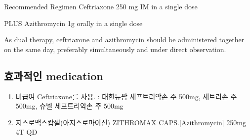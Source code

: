 \begin{commentbox}{Recommended Regimen}
Ceftriaxone 250 mg IM in a single dose \par
PLUS Azithromycin 1g orally in a single dose \par
As dual therapy, ceftriaxone and azithromycin should be administered together on the same day, preferably simultaneously and under direct observation.
\end{commentbox}

\subsection{효과적인 medication}
\begin{enumerate}\tightlist
\item 비급여 Ceftriaxone를 사용. : 대한뉴팜 세프트리악손 주 500mg, 세트리손 주 500mg, 슈넬 세프트리악손 주 500mg
\item 지스로맥스캅셀(아지스로마이신)  ZITHROMAX CAPS.[Azithromycin] 250mg 4T QD 
\end{enumerate}
